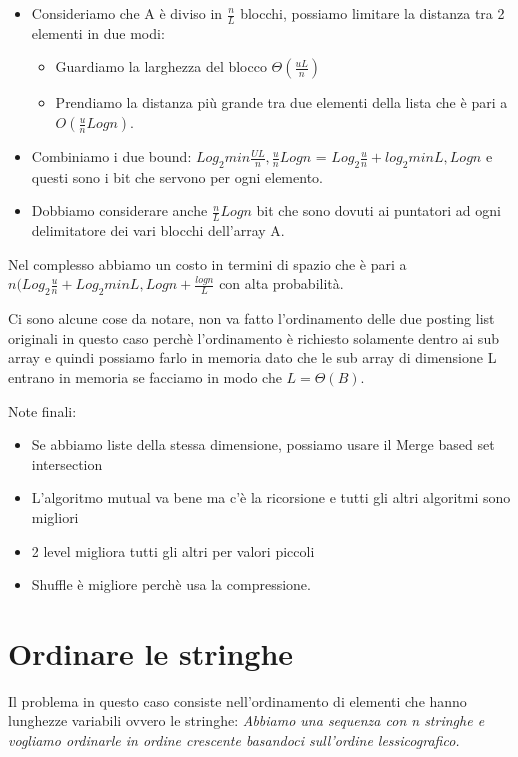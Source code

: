 \documentclass[14pt]{extreport}
\begin{document}
\begin{itemize}
\item Consideriamo che A è diviso in $\frac{n}{L}$ blocchi, possiamo limitare la distanza tra 2 elementi in due modi:
\begin{itemize}
\item Guardiamo la larghezza del blocco $\Theta(\frac{uL}{n})$
\item Prendiamo la distanza più grande tra due elementi della lista che è pari a $O(\frac{u}{n}Logn)$.
\end{itemize}
\item Combiniamo i due bound: $Log_2 min{\frac{UL}{n}, \frac{u}{n}Log n}$ = $Log_2 \frac{u}{n} + log_2 min{L,Log n}$ e questi sono i bit che servono per ogni elemento.
\item Dobbiamo considerare anche $\frac{n}{L}Logn$ bit che sono dovuti ai puntatori ad ogni delimitatore dei vari blocchi dell'array A.
\end{itemize}

Nel complesso abbiamo un costo in termini di spazio che è pari a $n(Log_2\frac{u}{n} + Log_2 min{L,Logn} + \frac{log n}{L}$ con alta probabilità.

Ci sono alcune cose da notare, non va fatto l'ordinamento delle due posting list originali in questo caso perchè l'ordinamento è richiesto solamente dentro ai sub array e quindi possiamo farlo in memoria dato che le sub array di dimensione L entrano in memoria se facciamo in modo che $L=\Theta(B)$.

Note finali:
\begin{itemize}
\item Se abbiamo liste della stessa dimensione, possiamo usare il Merge based set intersection
\item L'algoritmo mutual va bene ma c'è la ricorsione e tutti gli altri algoritmi sono migliori
\item 2 level migliora tutti gli altri per valori piccoli
\item Shuffle è migliore perchè usa la compressione.
\end{itemize}


\chapter{Ordinare le stringhe}

Il problema in questo caso consiste nell'ordinamento di elementi che hanno lunghezze variabili ovvero le stringhe:
\textit{Abbiamo una sequenza con n stringhe e vogliamo ordinarle in ordine crescente basandoci sull'ordine lessicografico.}
\end{document}
